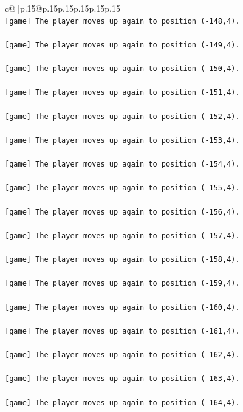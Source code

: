 \documentclass{article}
\begin{document}
{\begin{supertabular}{c@{$\;$}|p{.15\linewidth}@{}p{.15\linewidth}p{.15\linewidth}p{.15\linewidth}p{.15\linewidth}p{.15\linewidth}}
{{{\\ 
\texttt{{[}game{]} The player moves up again to position ({-}148,4).} \\
\\ 
\texttt{{[}game{]} The player moves up again to position ({-}149,4).} \\
\\ 
\texttt{{[}game{]} The player moves up again to position ({-}150,4).} \\
\\ 
\texttt{{[}game{]} The player moves up again to position ({-}151,4).} \\
\\ 
\texttt{{[}game{]} The player moves up again to position ({-}152,4).} \\
\\ 
\texttt{{[}game{]} The player moves up again to position ({-}153,4).} \\
\\ 
\texttt{{[}game{]} The player moves up again to position ({-}154,4).} \\
\\ 
\texttt{{[}game{]} The player moves up again to position ({-}155,4).} \\
\\ 
\texttt{{[}game{]} The player moves up again to position ({-}156,4).} \\
\\ 
\texttt{{[}game{]} The player moves up again to position ({-}157,4).} \\
\\ 
\texttt{{[}game{]} The player moves up again to position ({-}158,4).} \\
\\ 
\texttt{{[}game{]} The player moves up again to position ({-}159,4).} \\
\\ 
\texttt{{[}game{]} The player moves up again to position ({-}160,4).} \\
\\ 
\texttt{{[}game{]} The player moves up again to position ({-}161,4).} \\
\\ 
\texttt{{[}game{]} The player moves up again to position ({-}162,4).} \\
\\ 
\texttt{{[}game{]} The player moves up again to position ({-}163,4).} \\
\\ 
\texttt{{[}game{]} The player moves up again to position ({-}164,4).} \\
}}}
\end{supertabular}}
\end{document}
